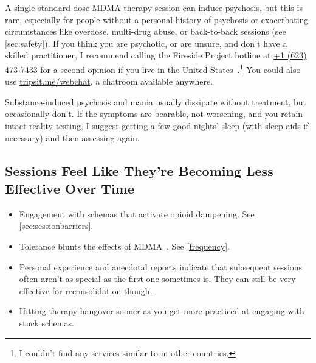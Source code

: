 \documentclass[11pt,oneside]{book}
\let\cite\parencite
\begin{document}
A single standard-dose MDMA therapy session can induce psychosis, but this is rare, especially for people without a personal history of psychosis or exacerbating circumstances like overdose, multi-drug abuse, or back-to-back sessions (see \cref{sec:safety}). If you think you are psychotic, or are unsure, and don't have a skilled practitioner, I recommend calling the Fireside Project hotline at \href{tel:1-623-473-7433}{+1 (623) 473-7433} for a second opinion if you live in the United States~\cite{firesideProject}.\footnote{I couldn't find any services similar to \cite{firesideProject} in other countries.} You could also use \href{https://tripsit.me/webchat}{tripsit.me/webchat}, a chatroom available anywhere.

Substance-induced psychosis and mania usually dissipate without treatment, but occasionally don't. If the symptoms are bearable, not worsening, and you retain intact reality testing, I suggest getting a few good nights' sleep (with sleep aids if necessary) and then assessing again.

\subsection{Sessions Feel Like They're Becoming Less Effective Over Time}
\begin{itemize}
    \item Engagement with schemas that activate opioid dampening. See \cref{sec:sessionbarriers}.
    \item Tolerance blunts the effects of MDMA~\cite{farreTolerance,parrottTolerance}. See \cref{frequency}.
    \item Personal experience and anecdotal reports indicate that subsequent sessions often aren't as special as the first one sometimes is. They can still be very effective for reconsolidation though.
    \item Hitting therapy hangover sooner as you get more practiced at engaging with stuck schemas.
\end{itemize}
\end{document}
